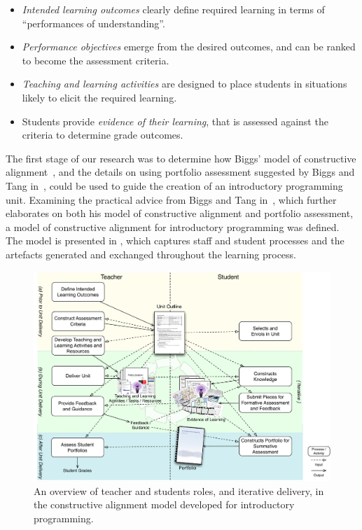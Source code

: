 \begin{itemize}
	\item \emph{Intended learning outcomes} clearly define required learning in terms of ``performances of understanding''.
	\item \emph{Performance objectives} emerge from the desired outcomes, and can be ranked to become the assessment criteria.
	\item \emph{Teaching and learning activities} are designed to place students in situations likely to elicit the required learning.
	\item Students provide \emph{evidence of their learning}, that is assessed against the criteria to determine grade outcomes.
\end{itemize}


The first stage of our research was to determine how Biggs' model of constructive alignment~\cite{Biggs:1996c}, and the details on using portfolio assessment suggested by Biggs and Tang in~\cite{Biggs:1997}, could be used to guide the creation of an introductory programming unit. Examining the practical advice from Biggs and Tang in~\cite{Biggs:2007}, which further elaborates on both his model of constructive alignment and portfolio assessment, a model of constructive alignment for introductory programming was defined. The model is presented in , which captures staff and student processes and the artefacts generated and exchanged throughout the learning process.

\begin{figure}[t!]
	\centering
	\includegraphics[width=6in]{ProcessOverview}
	\caption{An overview of teacher and students roles, and iterative delivery, in the constructive alignment model developed for introductory programming.}
	\label{fig:process_overview}
\end{figure}

